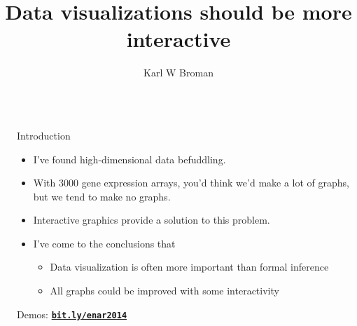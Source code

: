 \documentclass[final,plain]{beamer}
\title{Data visualizations should be more interactive}
\author{Karl W Broman}
\institute{Biostatistics \&
  Medical Informatics, University of Wisconsin--Madison}
\newlength{\sepwid}
\newlength{\onecolwid}
\newcommand{\bi}{\begin{itemize}}
\newcommand{\ei}{\end{itemize}}
\newcommand{\bluebold}{\color{dblue} \bf}
\newcommand{\colonevsep}{\vspace{20mm}}
\newcommand{\hilit}{\color{mypurple}}
\begin{document}
\begin{frame}[t]

\begin{columns}[t]
  \begin{column}{\sepwid}\end{column} %

  \begin{column}{\onecolwid}

    \begin{exampleblock}{\Large Introduction}{
        \bi \itemsep18pt
        \item I've found high-dimensional data {\hilit befuddling}.
        \item With 3000 gene expression arrays, you'd think we'd make
          {\hilit a lot} of graphs, but we tend to make {\hilit no} graphs.
        \item {\hilit Interactive graphics} provide a solution to this problem.
        \item I've come to the conclusions that
          \vspace{8pt}
           \bi \itemsep14pt
           \item Data visualization is often more important than
             formal inference
           \item All graphs could be improved with some interactivity
           \ei
        \ei

     \vspace{18pt}

        \centerline{Demos:
        \href{http://www.biostat.wisc.edu/~kbroman/posters/ENAR2014}{\tt \textbf{bit.ly/enar2014}}}

     }
    \end{exampleblock}


  \colonevsep %

\end{column}
\end{columns}
\end{frame}
\end{document}
